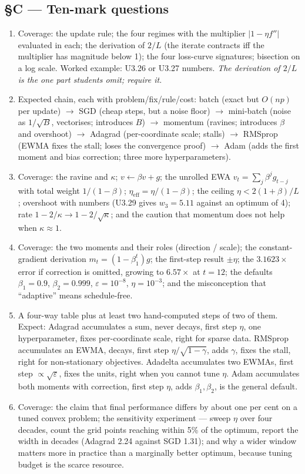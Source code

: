 \documentclass[11pt,a4paper]{article}
\newcommand{\A}[1]{\item[\textbf{#1}]}
\begin{document}
\subsection*{§C --- Ten-mark questions}

\begin{enumerate}[leftmargin=1.9cm]
\A{U3.45} Coverage: the update rule; the four regimes with the multiplier
$|1-\eta f''|$ evaluated in each; the derivation of $2/L$ (the iterate
contracts iff the multiplier has magnitude below 1); the four loss-curve
signatures; bisection on a log scale. Worked example: U3.26 or U3.27 numbers.
\emph{The derivation of $2/L$ is the one part students omit; require it.}

\A{U3.46} Expected chain, each with problem/fix/rule/cost:
batch (exact but $O(np)$ per update) $\to$ SGD (cheap steps, but a noise floor)
$\to$ mini-batch (noise as $1/\sqrt B$, vectorises; introduces $B$) $\to$
momentum (ravines; introduces $\beta$ and overshoot) $\to$ Adagrad
(per-coordinate scale; stalls) $\to$ RMSprop (EWMA fixes the stall; loses the
convergence proof) $\to$ Adam (adds the first moment and bias correction; three
more hyperparameters).

\A{U3.47} Coverage: the ravine and $\kappa$; $v \leftarrow \beta v + g$;
the unrolled EWA $v_t = \sum_j \beta^j g_{t-j}$ with total weight $1/(1-\beta)$;
$\eta_{\text{eff}} = \eta/(1-\beta)$; the ceiling $\eta < 2(1+\beta)/L$;
overshoot with numbers (U3.29 gives $w_3 = 5.11$ against an optimum of 4);
rate $1-2/\kappa \to 1-2/\sqrt\kappa$; and the caution that momentum does not
help when $\kappa \approx 1$.

\A{U3.48} Coverage: the two moments and their roles (direction / scale); the
constant-gradient derivation $m_t = (1-\beta_1^t)g$; the first-step result
$\pm\eta$; the $3.1623\times$ error if correction is omitted, growing to
$6.57\times$ at $t = 12$; the defaults $\beta_1 = 0.9$, $\beta_2 = 0.999$,
$\varepsilon = 10^{-8}$, $\eta = 10^{-3}$; and the misconception that
``adaptive'' means schedule-free.

\A{U3.49} A four-way table plus at least two hand-computed steps of two of
them. Expect: Adagrad accumulates a sum, never decays, first step $\eta$, one
hyperparameter, fixes per-coordinate scale, right for sparse data. RMSprop
accumulates an EWMA, decays, first step $\eta/\sqrt{1-\gamma}$, adds $\gamma$,
fixes the stall, right for non-stationary objectives. Adadelta accumulates two
EWMAs, first step $\propto\sqrt\varepsilon$, fixes the units, right when you
cannot tune $\eta$. Adam accumulates both moments with correction, first step
$\eta$, adds $\beta_1,\beta_2$, is the general default.

\A{U3.50} Coverage: the claim that final performance differs by about one per
cent on a tuned convex problem; the sensitivity experiment --- sweep $\eta$
over four decades, count the grid points reaching within 5\% of the optimum,
report the width in decades (Adagrad 2.24 against SGD 1.31); and why a wider
window matters more in practice than a marginally better optimum, because tuning
budget is the scarce resource.
\end{enumerate}
\end{document}
